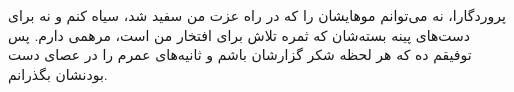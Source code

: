 \chapter*{}
\thispagestyle{empty}
\indent
\vskip 1cm

پروردگارا، نه می‌توانم موهایشان را که در راه عزت من سفید شد، سیاه کنم و نه برای دست‌های پینه بسته‌شان که ثمره تلاش برای افتخار من است، مرهمی دارم. پس توفیقم ده که هر لحظه شکر گزارشان باشم و ثانیه‌های عمرم را در عصای دست بودنشان بگذرانم.
